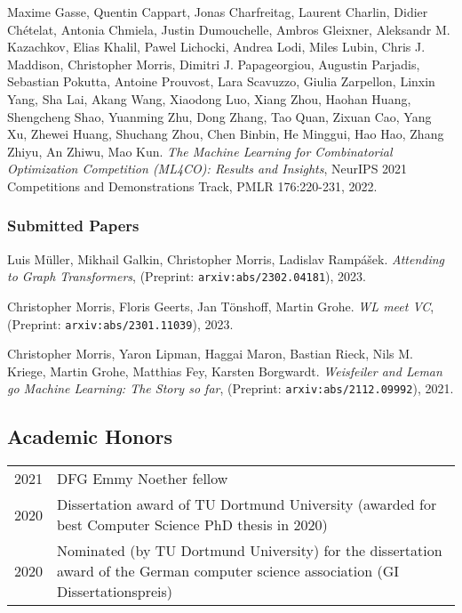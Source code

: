 \documentclass[11pt, a4paper, DIV=12]{scrartcl}
\begin{document}
\begin{thebibliography}{15}
	Maxime Gasse, Quentin Cappart, Jonas Charfreitag, Laurent Charlin, Didier Chételat, Antonia Chmiela, Justin Dumouchelle, Ambros Gleixner, Aleksandr M. Kazachkov, Elias Khalil, Pawel Lichocki, Andrea Lodi, Miles Lubin, Chris J. Maddison, Christopher Morris, Dimitri J. Papageorgiou, Augustin Parjadis, Sebastian Pokutta, Antoine Prouvost, Lara Scavuzzo, Giulia Zarpellon, Linxin Yang, Sha Lai, Akang Wang, Xiaodong Luo, Xiang Zhou, Haohan Huang, Shengcheng Shao, Yuanming Zhu, Dong Zhang, Tao Quan, Zixuan Cao, Yang Xu, Zhewei Huang, Shuchang Zhou, Chen Binbin, He Minggui, Hao Hao, Zhang Zhiyu, An Zhiwu, Mao Kun.
	\emph{The Machine Learning for Combinatorial Optimization Competition (ML4CO): Results and Insights}, NeurIPS 2021 Competitions and Demonstrations Track, PMLR 176:220-231, 2022.

\subsubsection*{Submitted Papers}

	Luis Müller, Mikhail Galkin, Christopher Morris, Ladislav Rampášek.
	\emph{Attending to Graph Transformers}, (Preprint: \texttt{arxiv:abs/2302.04181}), 2023. 
	
	Christopher Morris, Floris Geerts, Jan Tönshoff, Martin Grohe.
	\emph{WL meet VC}, (Preprint: \texttt{arxiv:abs/2301.11039}), 2023. 
	
	Christopher Morris, Yaron Lipman, Haggai Maron, Bastian Rieck, Nils M. Kriege, Martin Grohe, Matthias Fey, Karsten Borgwardt.
	\emph{Weisfeiler and Leman go Machine Learning: The Story so far}, (Preprint: \texttt{arxiv:abs/2112.09992}), 2021. 
\end{thebibliography}

\subsection*{Academic Honors}
\begin{tabular}{p{2.1cm}p{12.0cm}}
2021& DFG Emmy Noether fellow\\
2020& Dissertation award of TU Dortmund University (awarded for best Computer Science PhD thesis in 2020)\\
2020& Nominated (by TU Dortmund University) for the dissertation award of the German computer science association (GI Dissertationspreis)\\
\end{tabular}
\end{document}
